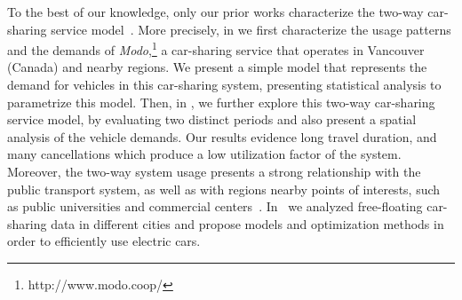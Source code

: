To the best of our knowledge, only our prior works characterize the  two-way car-sharing service model~\cite{rooke2018caracterizacao,rooke:19}. 
More precisely, in \cite{rooke2018caracterizacao} we first characterize the usage patterns and the demands of \textit{Modo},\footnote{http://www.modo.coop/} a car-sharing service that operates in Vancouver (Canada) and nearby regions. We present a simple model that represents the demand for vehicles in this car-sharing system, presenting statistical analysis to parametrize this model. Then, in \cite{rooke:19}, we further explore this two-way car-sharing service model, by evaluating two distinct periods and also present a spatial analysis of the vehicle demands. Our results evidence long travel duration, and many cancellations which produce a low utilization factor of the system. Moreover, the two-way system usage presents a strong relationship with the public transport system, as well as with regions nearby points of interests, such as public universities and commercial centers~\cite{rooke:19}.  In~\cite{coccaopt,coccacar} we analyzed free-floating car-sharing data in different cities and propose models and optimization methods in order to efficiently use electric cars.  

